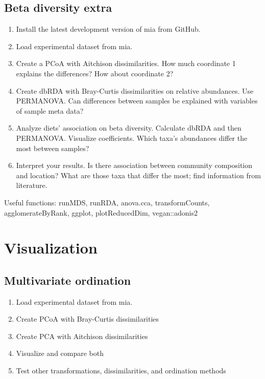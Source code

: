 \documentclass[
]{book}
\providecommand{\tightlist}{%
  \setlength{\itemsep}{0pt}\setlength{\parskip}{0pt}}
\begin{document}
\hypertarget{beta-diversity-extra}{%
\subsection{Beta diversity extra}\label{beta-diversity-extra}}

\begin{enumerate}
\def\labelenumi{\arabic{enumi}.}
\tightlist
\item
  Install the latest development version of mia from GitHub.
\item
  Load experimental dataset from mia.
\item
  Create a PCoA with Aitchison dissimilarities. How much coordinate 1 explains the differences? How about coordinate 2?
\item
  Create dbRDA with Bray-Curtis dissimilarities on relative abundances. Use PERMANOVA. Can differences between samples be explained with variables of sample meta data?
\item
  Analyze diets' association on beta diversity. Calculate dbRDA and then PERMANOVA. Visualize coefficients. Which taxa's abundances differ the most between samples?
\item
  Interpret your results. Is there association between community composition and location? What are those taxa that differ the most; find information from literature.
\end{enumerate}

Useful functions: runMDS, runRDA, anova.cca, transformCounts, agglomerateByRank, ggplot, plotReducedDim, vegan::adonis2

\hypertarget{visualization-1}{%
\section{Visualization}\label{visualization-1}}

\hypertarget{multivariate-ordination}{%
\subsection{Multivariate ordination}\label{multivariate-ordination}}

\begin{enumerate}
\def\labelenumi{\arabic{enumi}.}
\tightlist
\item
  Load experimental dataset from mia.
\item
  Create PCoA with Bray-Curtis dissimilarities
\item
  Create PCA with Aitchison dissimilarities
\item
  Visualize and compare both
\item
  Test other transformations, dissimilarities, and ordination methods
\end{enumerate}
\end{document}
